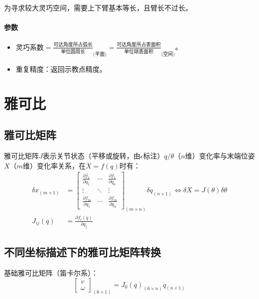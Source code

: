 \documentclass[
12pt, %
a4paper, 
oneside, %
headinclude,footinclude, %
]{scrartcl}
\begin{document}
为寻求较大灵巧空间，需要上下臂基本等长，且臂长不过长。
\paragraph{参数}
\begin{itemize}
\item $ \text{灵巧系数} = \frac{\text{可达角度所占弧长}}{\text{单位圆周长}}_{\text{(平面)}} = \frac{\text{可达角度所占表面积}}{\text{单位球表面积}}_{\text{(空间)}} $。
\item 重复精度：返回示教点精度。
\end{itemize} 
\section{雅可比}
\subsection[雅可比矩阵]{雅可比矩阵}
雅可比矩阵$ J $表示关节状态（平移或旋转，由$ \epsilon $标注）$ q/\theta $（$ n $维）变化率与末端位姿$ X $（$ m $维）变化率关系，在$ X = f(q) $时有：
\begin{align*}
\delta x_{(m \times 1)} &= \begin{bmatrix} \frac{\partial f_1}{\partial q_1} & \cdots & \frac{\partial f_1}{\partial q_n} \\ \vdots & \ddots & \vdots \\ \frac{\partial f_m}{\partial q_1} & \cdots & \frac{\partial f_m}{\partial q_n} \end{bmatrix}_{(m \times n)} \delta q_{(n \times 1)} \Leftrightarrow \delta X = J(\theta) \delta \theta \\
J_{ij}(q) &= \frac{\partial f_i(q)}{\partial q_j}
\end{align*}
\subsection[不同坐标描述下的雅可比矩阵转换]{不同坐标描述下的雅可比矩阵转换}
基础雅可比矩阵（笛卡尔系）：
$$ \begin{bmatrix} v \\ \omega \end{bmatrix}_{(6 \times 1)} = J_0(q)_{(6 \times n)} \dot{q}_{(n \times 1)} $$
\end{document}
